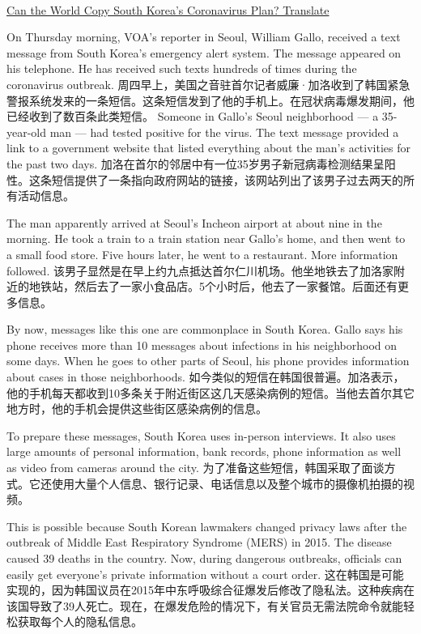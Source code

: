 \\\href{https://www.51voa.com/VOA_Special_English/can-the-world-copy-south-korea-s-coronavirus-plan-84162_1.html}{Can the World Copy South Korea’s Coronavirus Plan? Translate} \newline

On Thursday morning, VOA's reporter in Seoul, William Gallo, received a text message from South Korea's emergency alert system. The message appeared on his telephone. He has received such texts hundreds of times during the coronavirus outbreak.
周四早上，美国之音驻首尔记者威廉·加洛收到了韩国紧急警报系统发来的一条短信。这条短信发到了他的手机上。在冠状病毒爆发期间，他已经收到了数百条此类短信。
Someone in Gallo's Seoul neighborhood — a 35-year-old man — had tested positive for the virus. The text message provided a link to a government website that listed everything about the man's activities for the past two days.
加洛在首尔的邻居中有一位35岁男子新冠病毒检测结果呈阳性。这条短信提供了一条指向政府网站的链接，该网站列出了该男子过去两天的所有活动信息。

The man apparently arrived at Seoul's Incheon airport at about nine in the morning. He took a train to a train station near Gallo's home, and then went to a small food store. Five hours later, he went to a restaurant. More information followed.
该男子显然是在早上约九点抵达首尔仁川机场。他坐地铁去了加洛家附近的地铁站，然后去了一家小食品店。5个小时后，他去了一家餐馆。后面还有更多信息。

By now, messages like this one are commonplace in South Korea. Gallo says his phone receives more than 10 messages about infections in his neighborhood on some days. When he goes to other parts of Seoul, his phone provides information about cases in those neighborhoods.
如今类似的短信在韩国很普遍。加洛表示，他的手机每天都收到10多条关于附近街区这几天感染病例的短信。当他去首尔其它地方时，他的手机会提供这些街区感染病例的信息。

To prepare these messages, South Korea uses in-person interviews. It also uses large amounts of personal information, bank records, phone information as well as video from cameras around the city.
为了准备这些短信，韩国采取了面谈方式。它还使用大量个人信息、银行记录、电话信息以及整个城市的摄像机拍摄的视频。

This is possible because South Korean lawmakers changed privacy laws after the outbreak of Middle East Respiratory Syndrome (MERS) in 2015. The disease caused 39 deaths in the country. Now, during dangerous outbreaks, officials can easily get everyone's private information without a court order.
这在韩国是可能实现的，因为韩国议员在2015年中东呼吸综合征爆发后修改了隐私法。这种疾病在该国导致了39人死亡。现在，在爆发危险的情况下，有关官员无需法院命令就能轻松获取每个人的隐私信息。

